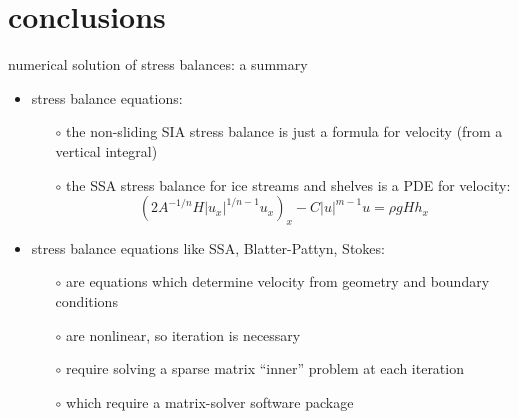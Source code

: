 
\section{conclusions}

\begin{frame}{numerical solution of stress balances: a summary}

\begin{itemize}
\item \alert{stress balance equations}:
  \begin{itemize}
  \item[$\circ$] the non-sliding SIA stress balance is just a formula for velocity (from a vertical integral)
  \item[$\circ$] the SSA stress balance for ice streams and shelves is a PDE for velocity:
  $$\left(2 A^{-1/n} H |u_x|^{1/n - 1} u_x\right)_x - C|u|^{m-1}u = \rho g H h_x$$
  \end{itemize}

\bigskip
\item stress balance equations like SSA, Blatter-Pattyn, Stokes:
  \begin{itemize}
  \item[$\circ$] are equations which determine velocity from geometry and boundary conditions
  \item[$\circ$] are \alert{nonlinear}, so iteration is necessary
  \item[$\circ$] require solving a sparse matrix ``inner'' problem at each iteration
  \item[$\circ$] which require a matrix-solver software package
  \end{itemize}
\end{itemize}
\end{frame}


